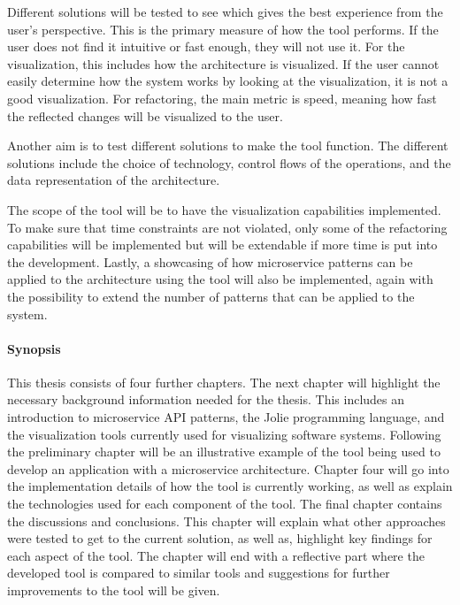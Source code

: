 Different solutions will be tested to see which gives the best experience from the user's perspective. This is the primary measure of how the tool performs. If the user does not find it intuitive or fast enough, they will not use it.
For the visualization, this includes how the architecture is visualized. If the user cannot easily determine how the system works by looking at the visualization, it is not a good visualization.
For refactoring, the main metric is speed, meaning how fast the reflected changes will be visualized to the user.

Another aim is to test different solutions to make the tool function.
The different solutions include the choice of technology, control flows of the operations, and the data representation of the architecture.

The scope of the tool will be to have the visualization capabilities implemented.
To make sure that time constraints are not violated, only some of the refactoring capabilities will be implemented but will be extendable if more time is put into the development.
Lastly, a showcasing of how microservice patterns can be applied to the architecture using the tool will also be implemented, again with the possibility to extend the number of patterns that can be applied to the system.

\paragraph{Synopsis}
This thesis consists of four further chapters. The next chapter will highlight the necessary background information needed for the thesis. This includes an introduction to microservice API patterns, the Jolie programming language, and the visualization tools currently used for visualizing software systems.
Following the preliminary chapter will be an illustrative example of the tool being used to develop an application with a microservice architecture.
Chapter four will go into the implementation details of how the tool is currently working, as well as explain the technologies used for each component of the tool.
The final chapter contains the discussions and conclusions. This chapter will explain what other approaches were tested to get to the current solution, as well as, highlight key findings for each aspect of the tool.
The chapter will end with a reflective part where the developed tool is compared to similar tools and suggestions for further improvements to the tool will be given.